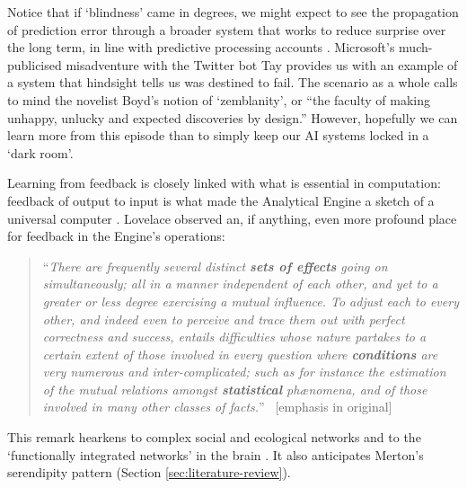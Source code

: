 Notice that if `blindness' came in degrees, we might expect to see the
propagation of prediction error through a broader system that works to
reduce surprise over the long term, in line with predictive processing
accounts \cite{Kiverstein2017,Friston2012}.  Microsoft's
much-publicised misadventure with the Twitter bot {\sf Tay}
\cite{wolf2017we} provides us with an example of a system that
hindsight tells us was destined to fail.  The scenario as a whole
calls to mind the novelist Boyd's \cite[p.~211]{boyd2010armadillo}
notion of `zemblanity', or ``the faculty of making unhappy, unlucky
and expected discoveries by design.''  However, hopefully we can learn
more from this episode than to simply keep our AI systems locked in a
`dark room'.

Learning from feedback is closely linked with what is essential in
computation: feedback of output to input is what made the Analytical
Engine a sketch of a universal computer \cite[p.~24]{Webb1980}.
Lovelace observed an, if anything, even more profound place for
feedback in the Engine's operations:
\begin{quote}
``\emph{There are frequently several distinct \emph{\textbf{sets of effects}} going on simultaneously; all in a manner independent of each other, and yet to a greater or less degree exercising a mutual influence. To adjust each to every other, and indeed even to perceive and trace them out with perfect correctness and success, entails difficulties whose nature partakes to a certain extent of those involved in every question where \emph{\textbf{conditions}} are very numerous and inter-complicated; such as for instance the estimation of the mutual relations amongst \emph{\textbf{statistical}} ph\ae nomena, and of those involved in many other classes of facts.}'' \cite[p.~710]{lovelace}~{[}emphasis in original{]}
\end{quote}
This remark hearkens to complex social and ecological networks and to
the `functionally integrated networks' in the brain \cite{Pessoa2017}.
It also anticipates Merton's serendipity pattern (Section
\ref{sec:literature-review}).
 
